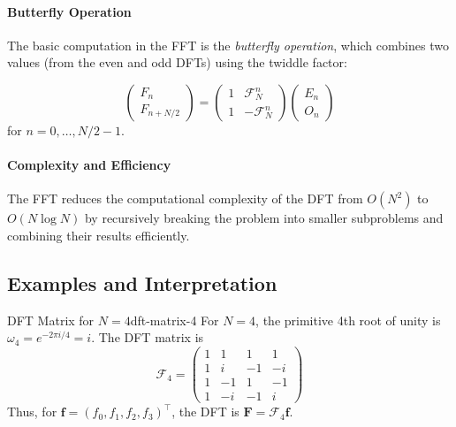 \paragraph{Butterfly Operation}

The basic computation in the FFT is the \emph{butterfly operation}, which combines two values (from the even and odd DFTs) using the twiddle factor:

\[
    \begin{pmatrix}
        F_n \\
        F_{n + N/2}
    \end{pmatrix}
    =
    \begin{pmatrix}
        1 & \mathcal{F}_N^n  \\
        1 & -\mathcal{F}_N^n
    \end{pmatrix}
    \begin{pmatrix}
        E_n \\
        O_n
    \end{pmatrix}
\]
for $n = 0, \ldots, N/2-1$.

\paragraph{Complexity and Efficiency}
The FFT reduces the computational complexity of the DFT from $O(N^2)$ to $O(N \log N)$ by recursively breaking the problem into smaller subproblems and combining their results efficiently.

\subsection{Examples and Interpretation}

\begin{example}{DFT Matrix for $N=4$}{dft-matrix-4}
    For $N = 4$, the primitive 4th root of unity is $\omega_4 = e^{-2\pi i / 4} = i$. The DFT matrix is
    \[
        \mathcal{F}_4 =
        \begin{pmatrix}
            1 & 1  & 1  & 1  \\
            1 & i  & -1 & -i \\
            1 & -1 & 1  & -1 \\
            1 & -i & -1 & i
        \end{pmatrix}
    \]
    Thus, for $\mathbf{f} = (f_0, f_1, f_2, f_3)^\top$, the DFT is $\mathbf{F} = \mathcal{F}_4 \mathbf{f}$.
\end{example}

